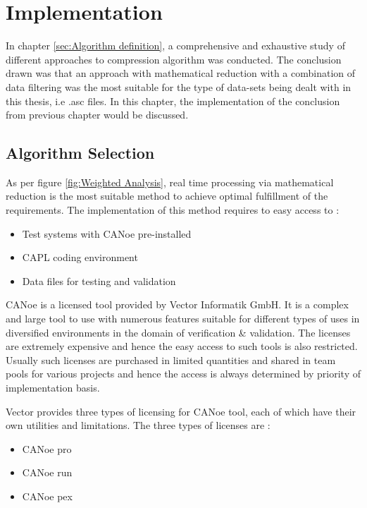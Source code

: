 \section{Implementation}
In chapter \ref{sec:Algorithm definition}, a comprehensive and exhaustive study of different approaches to compression algorithm was conducted. The conclusion drawn was that an approach with mathematical reduction with a combination of data filtering was the most suitable for the type of data-sets being dealt with in this thesis, i.e .asc files. In this chapter, the implementation of the conclusion from previous chapter would be discussed.

\subsection{Algorithm Selection}
As per figure \ref{fig:Weighted Analysis}, real time processing via mathematical reduction is the most suitable method to achieve optimal fulfillment of the requirements. The implementation of this method requires to easy access to :

\begin{itemize}
    \item Test systems with CANoe pre-installed
    \item CAPL coding environment
    \item Data files for testing and validation
\end{itemize}

CANoe is a licensed tool provided by Vector Informatik GmbH. It is a complex and large tool to use with numerous features suitable for different types of uses in diversified environments in the domain of verification \& validation. The licenses are extremely expensive and hence the easy access to such tools is also restricted. Usually such licenses are purchased in limited quantities and shared in team pools for various projects and hence the access is always determined by priority of implementation basis. 

Vector provides three types of licensing for CANoe tool, each of which have their own utilities and limitations. The three types of licenses are :

\begin{itemize}
    \item CANoe pro
    \item CANoe run
    \item CANoe pex
\end{itemize}

